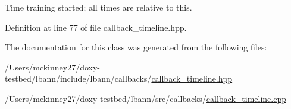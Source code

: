 Time training started; all times are relative to this. 



Definition at line 77 of file callback\+\_\+timeline.\+hpp.



The documentation for this class was generated from the following files\+:\begin{DoxyCompactItemize}
\item 
/\+Users/mckinney27/doxy-\/testbed/lbann/include/lbann/callbacks/\hyperlink{callback__timeline_8hpp}{callback\+\_\+timeline.\+hpp}\item 
/\+Users/mckinney27/doxy-\/testbed/lbann/src/callbacks/\hyperlink{callback__timeline_8cpp}{callback\+\_\+timeline.\+cpp}\end{DoxyCompactItemize}
